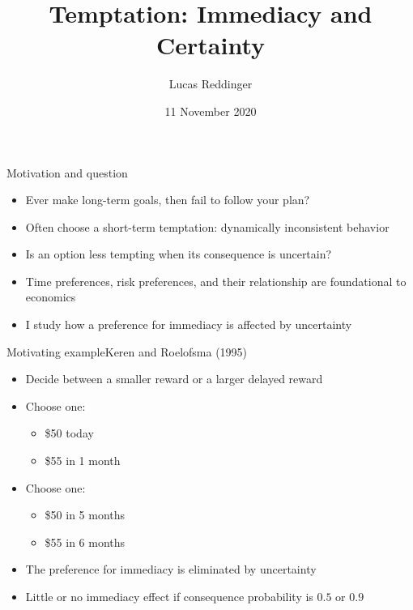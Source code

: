 \documentclass[professionalfont,10pt]{beamer}
\title{Temptation: Immediacy and Certainty}
\author{Lucas Reddinger}
\institute{UCSB}
\date{11 November 2020}
\begin{document}
\frame{\titlepage}

\begin{frame}{Motivation and question}
\begin{itemize}[<+->]
\item Ever make long-term goals, then fail to follow your plan?
\item Often choose a short-term temptation: dynamically inconsistent behavior
\vfill
\item \alert{Is an option less tempting when its consequence is uncertain?}
\vfill
\item Time preferences, risk preferences, and their relationship are foundational to economics
\vfill
\item I study how a \alert{preference for immediacy} is affected by \alert{uncertainty}
\end{itemize}
\end{frame}

\begin{frame}{Motivating example}{Keren and Roelofsma (1995)}
\begin{itemize}
    \item Decide between a smaller reward or a larger delayed reward
    \vspace{2\baselineskip}
    \pause
    \item Choose one:
    \begin{itemize}
      \item \$50 today 
      \item \$55 in 1 month 
    \end{itemize}
    \pause
    \item Choose one:
    \begin{itemize}
      \item \$50 in 5 months
      \item \$55 in 6 months  
    \end{itemize}
    \vspace{2\baselineskip}
    \item<8-> The preference for immediacy is eliminated by uncertainty
    \item<9-> Little or no immediacy effect if consequence probability is $0.5$ or $0.9$
\end{itemize}
\end{frame}
\end{document}
